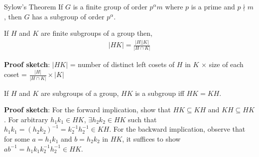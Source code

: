 \documentclass[titlepage, 12pt]{book}
\begin{document}
\begin{theorem}{Sylow's Theorem}{}
    If $G$ is a finite group of order $p^\alpha m$ where $p$ is a prime and
    $p\nmid m$, then $G$ has a subgroup of order $p^\alpha$.
\end{theorem}
\begin{proposition}{}{}
    If $H$ and $K$ are finite subgroups of a group then,
    \begin{gather*}
        |HK| = \frac{|H||K|}{|H\cap K|}
    \end{gather*}
\end{proposition}{}{}
\textbf{Proof sketch}: $|HK|$ = number of distinct left cosets of $H$ in $K$
$\times$ size of each coset = $\frac{|H|}{|H\cap K|}\times |K|$
\begin{proposition}{}{}
    If $H$ and $K$ are subgroups of a group, $HK$ is a subgroup iff $HK = KH$.
\end{proposition}
\textbf{Proof sketch}:  For the forward implication, show that $HK\subseteq KH$
and $KH\subseteq HK$. For arbitrary $h_1k_1\in HK$, $\exists h_2k_2\in HK$ such
that $h_1k_1 = (h_2k_2)^{-1} = k_2^{-1}h_2^{-1}\in KH$. For the backward
implication, observe that for some $a = h_1k_1$ and $b = h_2k_2$ in $HK$, it
suffices to show $ab^{-1} = h_1k_1k_2^{-1}h_2^{-1}\in HK$.
\end{document}
